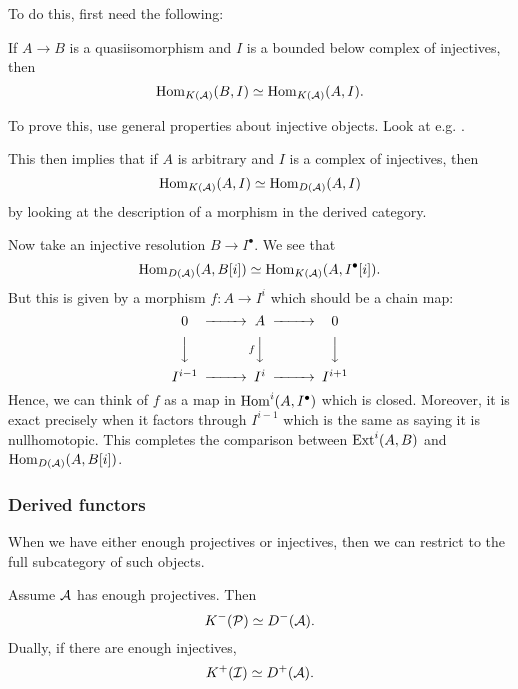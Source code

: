To do this, first need the following:

\begin{proposition}{}{}
     If $A\to B$ is a quasiisomorphism and $I$ is a bounded below complex of injectives, then
     \begin{equation*}
         \operatorname{Hom}_{K(\mathcal{A})}(B,I) \simeq \operatorname{Hom}_{K(\mathcal{A})}(A,I).
     \end{equation*}
\end{proposition}

To prove this, use general properties about injective objects. Look at e.g. \cite{Weibel}.

This then implies that if $A$ is arbitrary and $I$ is a complex of injectives, then
\begin{equation*}
    \operatorname{Hom}_{K(\mathcal{A})}(A,I) \simeq \operatorname{Hom}_{D(\mathcal{A})}(A,I)
\end{equation*}
by looking at the description of a morphism in the derived category.

Now take an injective resolution $B\to I^\bullet$. We see that
\begin{equation*}
    \operatorname{Hom}_{D(\mathcal{A})}(A,B[i]) \simeq \operatorname{Hom}_{K(\mathcal{A})}(A,I^\bullet[i]).
\end{equation*}
But this is given by a morphism $f:A\to I^i$ which should be a chain map:
\begin{equation*}
    \begin{CD}
        0 @>>> A @>>> 0 \\
          @VVV @VfVV @VVV \\
        I^{i-1} @>>> I^i @>>> I^{i+1}
    \end{CD}
\end{equation*}
Hence, we can think of $f$ as a map in $\operatorname{Hom}^i(A, I^\bullet)$ which is closed. Moreover, it is exact precisely when it factors through $I^{i-1}$ which is the same as saying it is nullhomotopic. This completes the comparison between $\operatorname{Ext}^i(A,B)$ and $\operatorname{Hom}_{D(\mathcal{A})}(A,B[i])$.

\subsubsection{Derived functors}

When we have either enough projectives or injectives, then we can restrict to the full subcategory of such objects.

\begin{theorem}{}{}
    Assume $\mathcal{A}$ has enough projectives. Then
    \begin{equation*}
        K^-(\mathcal{P}) \simeq D^-(\mathcal{A}).
    \end{equation*}
    Dually, if there are enough injectives,
    \begin{equation*}
        K^+(\mathcal{I}) \simeq D^+(\mathcal{A}).
    \end{equation*}
\end{theorem}

